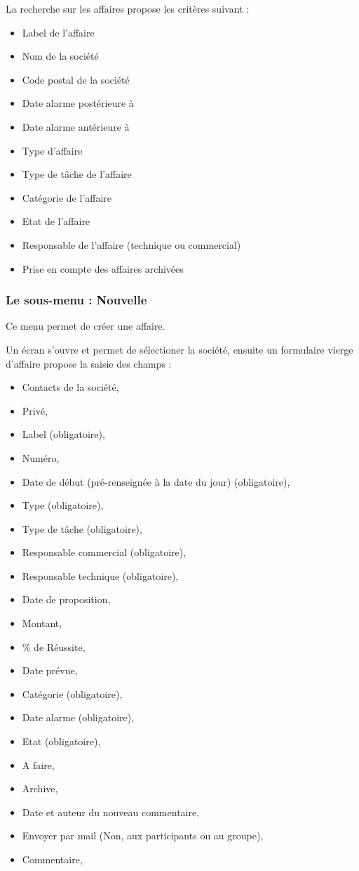 La recherche sur les affaires propose les critères suivant :

\begin{itemize}
\item Label de l'affaire
\item Nom de la société
\item Code postal de la société
\item Date alarme postérieure à
\item Date alarme antérieure à
\item Type d'affaire
\item Type de tâche de l'affaire
\item Catégorie de l'affaire
\item Etat de l'affaire
\item Responsable de l'affaire (technique ou commercial)
\item Prise en compte des affaires archivées
\end{itemize}

\subsubsection{Le sous-menu : Nouvelle}

Ce menu permet de créer une affaire.

Un écran s'ouvre et permet de sélectioner la société, ensuite un formulaire vierge d'affaire propose la saisie des champs :

\begin{itemize}
\item Contacts de la société,
\item Privé,
\item Label (obligatoire),
\item Numéro,
\item Date de début (pré-renseignée à la date du jour) (obligatoire),
\item Type (obligatoire),
\item Type de tâche (obligatoire),
\item Responsable commercial (obligatoire),
\item Responsable technique (obligatoire),
\item Date de proposition,
\item Montant,
\item \% de Réussite,
\item Date prévue,
\item Catégorie (obligatoire),
\item Date alarme (obligatoire),
\item Etat (obligatoire),
\item A faire,
\item Archive,
\item Date et auteur du nouveau commentaire,
\item Envoyer par mail (Non, aux participants ou au groupe),
\item Commentaire,
\end{itemize}
\vspace{0.3cm}


